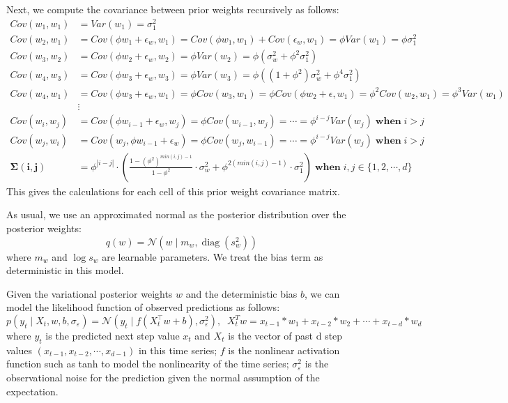 \documentclass{article}
\begin{document}
Next, we compute the covariance between prior weights recursively as follows:
$$\begin{aligned}
    Cov(w_1, w_1) &= Var(w_1) = \sigma^2_1 \\
    Cov(w_2,w_1) &= Cov(\phi w_1+\epsilon_w, w_1)=Cov(\phi w_1, w_1)+Cov(\epsilon_w,w_1)= \phi Var(w_1)= \phi \sigma_1^2 \\
    Cov(w_3, w_2) &= Cov(\phi w_2 + \epsilon_w, w_2) = \phi Var(w_2)=\phi(\sigma^2_w + \phi^2\sigma_1^2)\\
    Cov(w_4, w_3) &= Cov(\phi w_3 + \epsilon_w, w_3) = \phi Var(w_3)=\phi((1+\phi^2)\sigma^2_w + \phi^4\sigma_1^2)\\
    Cov(w_4, w_1) &= Cov(\phi w_3 + \epsilon_w, w_1)= \phi Cov(w_3, w_1) = \phi Cov(\phi w_2+\epsilon,w_1)=\phi^2Cov(w_2,w_1)=\phi^3Var(w_1) \\
    &\vdots \\
    Cov(w_i, w_j) &= Cov(\phi w_{i-1}+\epsilon_w, w_j)= \phi Cov(w_{i-1},w_j)=\cdots=\phi^{i-j}Var(w_j)\; \textbf{when}\; i> j\\
    Cov(w_j, w_i) &= Cov(w_j, \phi w_{i-1}+\epsilon_w) = \phi Cov(w_j, w_{i-1})=\cdots = \phi^{i-j}Var(w_j)\;\textbf{when}\; i>j\\
    \mathbf{\Sigma(i,j)} &= \phi^{|i-j|}\cdot\left( \frac{1-(\phi^2)^{min(i,j)-1}}{1-\phi^2}\cdot \sigma_w^2 + \phi^{2(min(i,j)-1)}\cdot\sigma_1^2\right)\;\textbf{when}\; i,j\in \{1,2,\cdots,d\}
\end{aligned}$$
This gives the calculations for each cell of this prior weight covariance matrix.

As usual, we use an approximated normal as the posterior distribution over the posterior weights: $$q(w)=\mathcal{N}\left(w \mid m_w, \operatorname{diag}\left(s_w^2\right)\right)$$ where $m_w$ and $\log s_w$ are learnable parameters. We treat the bias term as deterministic in this model. 

Given the variational posterior weights $w$ and the deterministic bias $b$, we can model the likelihood function of observed predictions as follows:
$$p\left(y_t \mid X_t, w, b, \sigma_{\varepsilon}\right)=\mathcal{N}\left(y_t \mid f \left(X_t^{\top} w+b\right), \sigma_{\varepsilon}^2\right),\;\; X_t^Tw = x_{t-1}*w_1+x_{t-2}*w_2+\cdots+x_{t-d}*w_d$$ where $y_t$ is the predicted next step value $x_{t}$ and $X_t$ is the vector of past d step values $(x_{t-1}, x_{t-2},\cdots, x_{d-1})$ in this time series; $f$ is the nonlinear activation function such as tanh to model the nonlinearity of the time series; $\sigma_{\varepsilon}^2$ is the observational noise for the prediction given the normal assumption of the expectation. 
\end{document}
